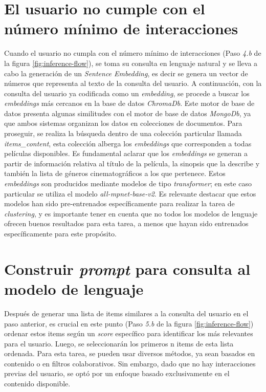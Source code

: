 \documentclass[11pt,a4paper,twoside]{thesis}
\begin{document}
\section{El usuario no cumple con el número mínimo de interacciones}

Cuando el usuario no cumpla con el número mínimo de interacciones (Paso \textit{4.b} de la figura \ref{fig:inference-flow}), se toma su consulta en lenguaje natural y se lleva a cabo la generación de un \textit{Sentence Embedding}, es decir se genera un vector de números que representa al texto de la consulta del usuario. A continuación, con la consulta del usuario ya codificada como un \textit{embedding}, se procede a buscar los \textit{embeddings} más cercanos en la base de datos \textit{ChromaDb}. Este motor de base de datos presenta algunas similitudes con el motor de base de datos \textit{MongoDb}, ya que ambos sistemas organizan los datos en colecciones de documentos. Para proseguir, se realiza la búsqueda dentro de una colección particular llamada \textit{items\_content}, esta colección alberga los \textit{embeddings} que corresponden a todas películas disponibles. Es fundamental aclarar que los \textit{embeddings} se generan a partir de información relativa al título de la película, la sinopsis que la describe y también la lista de géneros cinematográficos a los que pertenece. Estos \textit{embeddings} son producidos mediante modelos de tipo \textit{transformer}; en este caso particular se utiliza el modelo \textit{all-mpnet-base-v2}. Es relevante destacar que estos modelos han sido pre-entrenados específicamente para realizar la tarea de \textit{clustering}, y es importante tener en cuenta que no todos los modelos de lenguaje ofrecen buenos resultados para esta tarea, a menos que hayan sido entrenados específicamente para este propósito.

\section{Construir \textit{prompt} para consulta al modelo de lenguaje}

Después de generar una lista de items similares a la consulta del usuario en el paso anterior, es crucial en este punto (Paso \textit{5.b} de la figura \ref{fig:inference-flow}) ordenar estos items según un \textit{score} específico para identificar los más relevantes para el usuario. Luego, se seleccionarán los primeros n items de esta lista ordenada. Para esta tarea, se pueden usar diversos métodos, ya sean basados en contenido o en filtros colaborativos. Sin embargo, dado que no hay interacciones previas del usuario, se optó por un enfoque basado exclusivamente en el contenido disponible.
\end{document}
